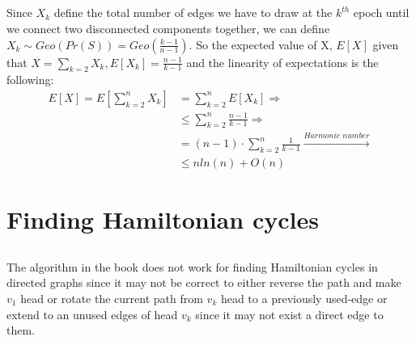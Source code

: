 \documentclass[11pt]{537homework}
\begin{document}
\subsection{} 
Since $X_k$ define the total number of edges we have to draw at the $k^{th}$ epoch until we connect two disconnected components together, we can define $X_k \sim Geo(Pr(S)) = Geo(\frac{k-1}{n-1})$. So the expected value of X, $E[X]$ given that $X = \sum_{k=2}^{} X_k, E[X_k] = \frac{n-1}{k-1}$ and the linearity of expectations is the following: 
\begin{align*}
    E[X] = E[\sum_{k=2}^{n} X_k] &= \sum_{k=2}^{n} E[X_k]  \Longrightarrow \\
                                &\leq \sum_{k=2}^{n} \frac{n-1}{k-1} \Longrightarrow \\
                                &= (n-1) \cdot \sum_{k=2}^{n} \frac{1}{k-1} \xrightarrow{\textit{Harmonic number}}\\ 
                                &\leq nln(n) +O(n)
\end{align*}

\section{Finding Hamiltonian cycles}
\subsection{} 
The algorithm in the book does not work for finding Hamiltonian cycles in directed graphs since it may not be correct to either reverse the path and make $v_1$ head or rotate the current path from $v_k$ head to a previously used-edge or extend to an unused edges of head $v_k$ since it may not exist a direct edge to them.
\end{document}
